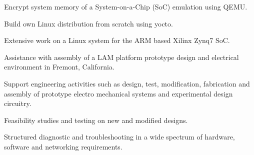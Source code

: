 \documentclass[]{resume}
\begin{document}
\begin{minipage}[t]{0.66\textwidth}
 
	\begin{tightemize}

	\item Encrypt system memory of a System-on-a-Chip (SoC) emulation using QEMU.
	\item Build own Linux distribution from scratch using yocto.
	\item Extensive work on a Linux system for the ARM based Xilinx Zynq7 SoC.

	\end{tightemize}
	\sectionsep
 
	\begin{tightemize}

	\item Assistance with assembly of a LAM platform prototype design and electrical environment in Fremont, California.
	\item Support engineering activities such as design, test, modification, fabrication and assembly of prototype electro mechanical systems and experimental design circuitry.
	\item Feasibility studies and testing on new and modified designs.
	\item Structured diagnostic and troubleshooting in a wide spectrum of hardware, software and networking requirements.

	\end{tightemize}
	\sectionsep
\end{minipage} 
\vfill \vfill \vfill \vfill
\pagebreak
\end{document}
